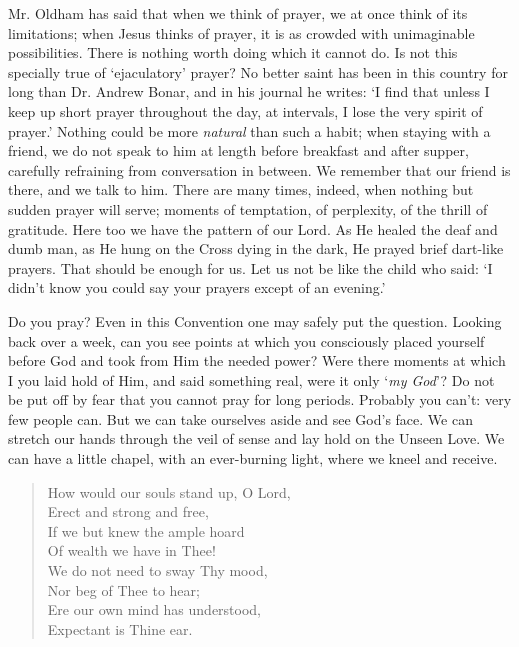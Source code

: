 \documentclass[12pt,a5paper]{article}
\begin{document}
Mr. Oldham has said that when we think of prayer, we at once think of its limitations; when Jesus thinks of prayer, it is as crowded with unimaginable possibilities. There is nothing worth doing which it cannot do. Is not this specially true of `ejaculatory' prayer? No better saint has been in this country for long than Dr. Andrew Bonar, and in his journal he writes: `I find that unless I keep up short prayer throughout the day, at intervals, I lose the very spirit of prayer.' Nothing could be more \textit{natural} than such a habit; when staying with a friend, we do not speak to him at length before breakfast and after supper, carefully refraining from conversation in between. We remember that our friend is there, and we talk to him. There are many times, indeed, when nothing but sudden prayer will serve; moments of temptation, of perplexity, of the thrill of gratitude. Here too we have the pattern of our Lord. As He healed the deaf and dumb man, as He hung on the Cross dying in the dark, He prayed brief dart-like prayers. That should be enough for us. Let us not be like the child who said: `I didn't know you could say your prayers except of an evening.'

Do you pray? Even in this Convention one may safely put the question. Looking back over a week, can you see points at which you consciously placed yourself before God and took from Him the needed power? Were there moments at which I you laid hold of Him, and said something real, were it only `\textit{my God}'? Do not be put off by fear that you cannot pray for long periods. Probably you can't: very few people can. But we can take ourselves aside and see God's face. We can stretch our hands through the veil of sense and lay hold on the Unseen Love. We can have a little chapel, with an ever-burning light, where we kneel and receive.

\begin{verse}
How would our souls stand up, O Lord, \\
\hspace{1em}Erect and strong and free, \\
If we but knew the ample hoard \\
\hspace{1em}Of wealth we have in Thee!\\
We do not need to sway Thy mood, \\
\hspace{1em}Nor beg of Thee to hear; \\
Ere our own mind has understood, \\
\hspace{1em}Expectant is Thine ear.
\end{verse}
  
\end{document}
